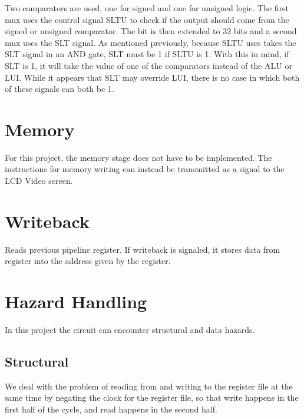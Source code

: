 \documentclass[10pt]{article}
\begin{document}
Two comparators are used, one for signed and one for unsigned logic. The first mux uses the control signal SLTU to check if the output should come from the signed or unsigned comparator. The bit is then extended to 32 bits and a second mux uses the SLT signal. As mentioned previously, because SLTU uses takes the SLT signal in an AND gate, SLT must be 1 if SLTU is 1. With this in mind, if SLT is 1, it will take the value of one of the comparators instead of the ALU or LUI. While it appears that SLT may override LUI, there is no case in which both of these signals can both be 1.

\section{Memory}
For this project, the memory stage does not have to be implemented. The instructions for memory writing can instead be transmitted as a signal to the LCD Video screen. 

\section{Writeback}
Reads previous pipeline register. If writeback is signaled, it stores data from register into the address given by the register.

\newpage
\section{Hazard Handling}
In this project the circuit can encounter structural and data hazards. 
\subsection{Structural}
We deal with the problem of reading from and writing to the register file at the same time by negating the clock for the register file, so that write happens in the first half of the cycle, and read happens in the second half.
\end{document}
